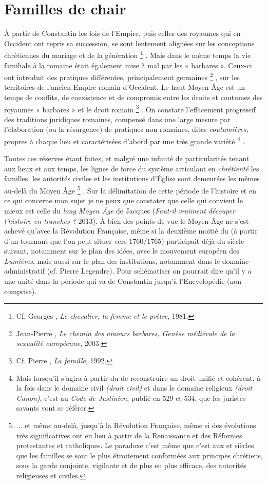 \section{Familles de chair}


 À partir de Constantin les lois de l'Empire, puis celles des royaumes qui en Occident ont repris sa succession, se sont lentement alignées sur les conceptions chrétiennes du mariage et de la génération
\footnote{Cf. Georges , \emph{Le chevalier, la femme et le prêtre}, 1981.}%
. Mais dans le même temps la vie familiale à la romaine était également mise à mal par les « barbares ». Ceux-ci ont introduit des pratiques différentes, principalement germaines
\footnote{Jean-Pierre , \emph{Le chemin des amours barbares, Genèse médiévale de la sexualité européenne}, 2003.}%
, sur les territoires de l'ancien Empire romain d'Occident. Le haut Moyen Âge est un temps de conflits, de coexistence et de compromis entre les droits et coutumes des royaumes « barbares » et le droit romain%
\footnote{Cf. Pierre , \emph{La famille}, 1992.}%
. On constate l'effacement progressif des traditions juridiques romaines, compensé dans une large mesure par l'élaboration (ou la résurgence) de pratiques non romaines, dites \emph{coutumières}, propres à chaque lieu et caractérisées d'abord par une très grande variété%
\footnote{Mais lorsqu'il s'agira à partir du  de reconstruire un droit unifié et cohérent, à la fois dans le domaine civil \emph{(droit civil)} et dans le domaine religieux \emph{(droit Canon)}, c'est au \emph{Code de Justinien}, publié en 529 et 534, que les juristes savants vont se référer.}%
. 

 Toutes ces réserves étant faites, et malgré une infinité de particularités tenant aux lieux et aux temps, les lignes de force du système articulant en \emph{chrétienté} les familles, les autorités civiles et les institutions d'Église sont demeurées les mêmes au-delà du Moyen Âge%
\footnote{... et même au-delà, jusqu'à la Révolution Française, même si des évolutions très significatives ont eu lieu à partir de la Renaissance et des Réformes protestantes et catholiques. Le paradoxe c'est même que c'est aux  et  siècles que les familles se sont le plus étroitement conformées aux principes chrétiens, sous la garde conjointe, vigilante et de plus en plus efficace, des autorités religieuses et civiles.}%
. Sur la délimitation de cette période de l'histoire et en ce qui concerne mon sujet je ne peux que constater que celle qui convient le mieux est celle du \emph{long Moyen Âge} de Jacques  (\emph{Faut-il vraiment découper l'histoire en tranches ?} 2013). À bien des points de vue le Moyen Âge ne s'est achevé qu'avec la Révolution Française, même si la deuxième moitié du  (à partir d'un tournant que l'on peut situer vers 1760/1765) participait déjà du siècle suivant, notamment sur le plan des idées, avec le mouvement européen des \emph{Lumières}, mais aussi sur le plan des institutions, notamment dans le domaine administratif (cf. Pierre Legendre). Pour schématiser on pourrait dire qu'il y a une unité dans la période qui va de Constantin jusqu'à l'Encyclopédie (non comprise). 

